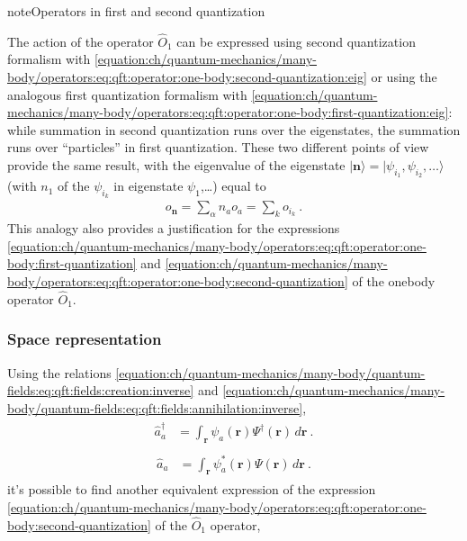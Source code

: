 \documentclass[letterpaper,10pt,english]{jupyterBook}
\begin{document}
\begin{sphinxadmonition}{note}{Operators in first and second quantization}

\sphinxAtStartPar
The action of the operator \(\hat{O}_1\) can be expressed using second quantization formalism with \eqref{equation:ch/quantum-mechanics/many-body/operators:eq:qft:operator:one-body:second-quantization:eig} or using the analogous first quantization formalism with \eqref{equation:ch/quantum-mechanics/many-body/operators:eq:qft:operator:one-body:first-quantization:eig}: while summation in second quantization runs over the eigenstates, the summation runs over “particles” in first quantization. These two different points of view provide the same result, with the eigenvalue of the eigenstate \(| \mathbf{n} \rangle = | \psi_{i_1}, \psi_{i_2}, \dots \rangle\) (with \(n_1\) of the \(\psi_{i_k}\) in eigenstate \(\psi_{1}\),…) equal to
\begin{equation*}
\begin{split}o_{\mathbf{n}} = \sum_{\alpha} n_a o_a = \sum_{k} o_{i_k} \ .\end{split}
\end{equation*}
\sphinxAtStartPar
This analogy also provides a justification for the expressions \eqref{equation:ch/quantum-mechanics/many-body/operators:eq:qft:operator:one-body:first-quantization} and \eqref{equation:ch/quantum-mechanics/many-body/operators:eq:qft:operator:one-body:second-quantization} of the one\sphinxhyphen{}body operator \(\hat{O}_1\).
\end{sphinxadmonition}


\subsubsection{Space representation}
\label{\detokenize{ch/quantum-mechanics/many-body/operators:space-representation}}
\sphinxAtStartPar
Using the relations \eqref{equation:ch/quantum-mechanics/many-body/quantum-fields:eq:qft:fields:creation:inverse} and \eqref{equation:ch/quantum-mechanics/many-body/quantum-fields:eq:qft:fields:annihilation:inverse},
\begin{equation*}
\begin{split}\begin{aligned}
  \hat{a}^\dagger_{a} 
  & = \int_{\mathbf{r}} \psi_a(\mathbf{r}) \Psi^\dagger(\mathbf{r}) \, d \mathbf{r} \ .
\end{aligned}\end{split}
\end{equation*}\begin{equation*}
\begin{split}\begin{aligned}
  \hat{a}_{a} 
  & = \int_{\mathbf{r}} \psi_a^*(\mathbf{r}) \Psi(\mathbf{r}) \, d \mathbf{r} \ .
\end{aligned}\end{split}
\end{equation*}
\sphinxAtStartPar
it’s possible to find another equivalent expression of the expression \eqref{equation:ch/quantum-mechanics/many-body/operators:eq:qft:operator:one-body:second-quantization} of the \(\hat{O}_1\) operator,
\end{document}
